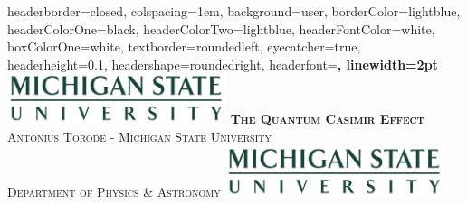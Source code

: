\documentclass[landscape,a0paper,fontscale=0.285]{baposter} %
\begin{document}
\begin{poster}
{
headerborder=closed, %
colspacing=1em, %
background=user,
borderColor=lightblue, %
headerColorOne=black, %
headerColorTwo=lightblue, %
headerFontColor=white, %
boxColorOne=white, %
textborder=roundedleft, %
eyecatcher=true, %
headerheight=0.1\textheight, %
headershape=roundedright, %
headerfont=\Large\bf\textsc, %
linewidth=2pt %
}
%
{\includegraphics[height=4em]{MSU.jpg}} %
{\bf\textsc{The Quantum Casimir Effect}\vspace{0.5em}} %
{\textsc{Antonius Torode -  \hspace{12pt} Michigan State University \\ Department of Physics \& Astronomy}} %
{\includegraphics[height=4em]{MSU.jpg}} %



\end{poster}
\end{document}
